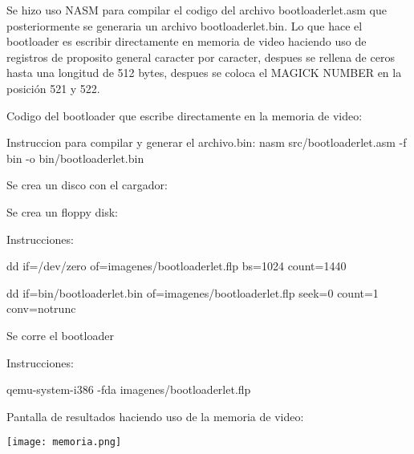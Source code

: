 \documentclass[12pt, a4paper]{report}
\begin{document}
\newpage

\begin{center}
Se hizo uso NASM para compilar el codigo del archivo bootloaderlet.asm que posteriormente se generaria un archivo bootloaderlet.bin. Lo que hace el bootloader es escribir directamente en memoria de video haciendo uso de registros de proposito general caracter por caracter, despues se rellena de ceros hasta una longitud de 512 bytes, despues se coloca el MAGICK NUMBER en la posición 521 y 522.

\bigskip
\bigskip

\begin{flushleft}
Codigo del bootloader que escribe directamente en la memoria de video:

\bigskip
\bigskip


\end{flushleft}


Instruccion para compilar y generar el archivo.bin: nasm src/bootloaderlet.asm -f bin -o  bin/bootloaderlet.bin

\bigskip
\end{center}
\begin{center}
Se crea un disco con el cargador:

Se crea un floppy disk:

Instrucciones: 
\bigskip

dd if=/dev/zero of=imagenes/bootloaderlet.flp bs=1024 count=1440

\bigskip

dd if=bin/bootloaderlet.bin of=imagenes/bootloaderlet.flp seek=0 count=1 conv=notrunc

\bigskip

Se corre el bootloader

\bigskip

Instrucciones:

\bigskip

qemu-system-i386 -fda imagenes/bootloaderlet.flp

\bigskip

Pantalla de resultados haciendo uso de la memoria de video:

\bigskip

\texttt{[image: memoria.png]}

\bigskip




\end{center}
\newpage
\end{document}
